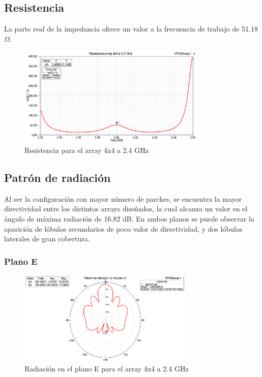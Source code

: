 \subsection{Resistencia}
\par La parte real de la impedancia ofrece un valor a la frecuencia de trabajo de 51.18 $\Omega$.
\\
\begin{figure}[H]
    \centering
        \includegraphics[width=0.8\textwidth]{archivos/analisis/4x41/3}
        \caption{Resistencia para el array 4x4 a 2.4 GHz}
        \label{fig:resis4x41}
\end{figure}

\subsection{Patrón de radiación}
\par Al ser la configuración con mayor número de parches, se encuentra la mayor directividad entre los distintos arrays diseñados, la cual alcanza un valor en el ángulo de máxima radiación de 16.82 dB. En ambos planos se puede observar la aparición de lóbulos secundarios de poco valor de directividad, y dos lóbulos laterales de gran cobertura.
\\
\subsubsection{Plano E}
\begin{figure}[H]
    \centering
        \includegraphics[width=0.75\textwidth]{archivos/analisis/4x41/4}
        \caption{Radiación en el plano E para el array 4x4 a 2.4 GHz}
        \label{fig:E4x41}
\end{figure}

